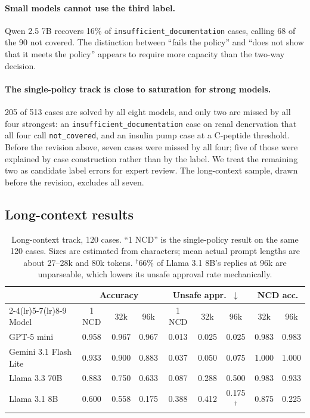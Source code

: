 \documentclass[11pt]{article}
\newcommand{\ncov}{\texttt{not\_covered}}
\newcommand{\insuf}{\texttt{insufficient\_documentation}}
\begin{document}
\paragraph{Small models cannot use the third label.} Qwen 2.5 7B recovers 16\% of
\insuf{} cases, calling 68 of the 90 not covered. The distinction between ``fails the policy''
and ``does not show that it meets the policy'' appears to require more capacity than the
two-way decision.

\paragraph{The single-policy track is close to saturation for strong models.} 205 of 513 cases
are solved by all eight models, and only two are missed by all four strongest: an
\insuf{} case on renal denervation that all four call \ncov{}, and an insulin pump case at a
C-peptide threshold. Before the revision above, seven cases were missed by all four; five of
those were explained by case construction rather than by the label. We treat the remaining two as
candidate label errors for expert review. The long-context sample, drawn before the revision,
excludes all seven.

\subsection{Long-context results}

\begin{table}[t]
\centering
\small
\caption{Long-context track, 120 cases. ``1 NCD'' is the single-policy result on the same 120
cases. Sizes are estimated from characters; mean actual prompt lengths are about 27--28k and 80k
tokens. $^\dagger$66\% of Llama 3.1 8B's replies at 96k are unparseable, which lowers its unsafe
approval rate mechanically.}
\label{tab:long}
\begin{tabular}{lcccccccc}
\toprule
 & \multicolumn{3}{c}{Accuracy} & \multicolumn{3}{c}{Unsafe appr.\ $\downarrow$} & \multicolumn{2}{c}{NCD acc.} \\
\cmidrule(lr){2-4}\cmidrule(lr){5-7}\cmidrule(lr){8-9}
Model & 1 NCD & 32k & 96k & 1 NCD & 32k & 96k & 32k & 96k \\
\midrule
GPT-5 mini            & 0.958 & 0.967 & 0.967 & 0.013 & 0.025 & 0.025 & 0.983 & 0.983 \\
Gemini 3.1 Flash Lite & 0.933 & 0.900 & 0.883 & 0.037 & 0.050 & 0.075 & 1.000 & 1.000 \\
Llama 3.3 70B         & 0.883 & 0.750 & 0.633 & 0.087 & 0.288 & 0.500 & 0.983 & 0.933 \\
Llama 3.1 8B          & 0.600 & 0.558 & 0.175 & 0.388 & 0.412 & 0.175$^\dagger$ & 0.875 & 0.225 \\
\bottomrule
\end{tabular}
\end{table}
\end{document}
